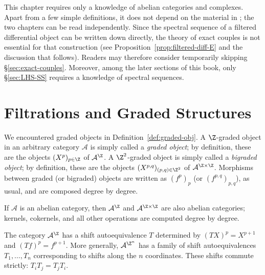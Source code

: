 \begin{wenxintishi}
	This chapter requires only a knowledge of abelian categories and complexes.
	Apart from a few simple definitions, it does not depend on the material in
	; the two chapters can be read
	independently. Since the spectral sequence of a filtered differential object
	can be written down directly, the theory of exact couples is not essential
	for that construction (see Proposition~\ref{prop:filtered-diff-E} and the
	discussion that follows). Readers may therefore consider temporarily
	skipping \S\ref{sec:exact-couples}. Moreover, among the later sections of
	this book, only \S\ref{sec:LHS-SS} requires a knowledge of spectral
	sequences.
\end{wenxintishi}

\section{Filtrations and Graded Structures}\label{sec:grading-filtration}

We encountered graded objects in Definition~\ref{def:graded-obj}. A
$\Z$-graded object in an arbitrary category $\mathcal{A}$ is simply called a
\emph{graded object}; by definition, these are the objects
$(X^p)_{p\in\Z}$ of $\mathcal{A}^{\Z}$. A $\Z^2$-graded object is simply
called a \emph{bigraded object}; by definition, these are the objects
$(X^{p,q})_{(p,q)\in\Z^2}$ of $\mathcal{A}^{\Z\times\Z}$. Morphisms between
graded (or bigraded) objects are written as $(f^p)_p$ (or
$(f^{p,q})_{p,q}$), as usual, and are composed degree by degree.

If $\mathcal{A}$ is an abelian category, then $\mathcal{A}^{\Z}$ and
$\mathcal{A}^{\Z\times\Z}$ are also abelian categories; kernels, cokernels,
and all other operations are computed degree by degree.

The category $\mathcal{A}^{\Z}$ has a shift autoequivalence $T$ determined by
$(TX)^p=X^{p+1}$ and $(Tf)^p=f^{p+1}$. More generally,
$\mathcal{A}^{\Z^n}$ has a family of shift autoequivalences
$T_1,\ldots,T_n$ corresponding to shifts along the $n$ coordinates. These
shifts commute strictly: $T_iT_j=T_jT_i$.

